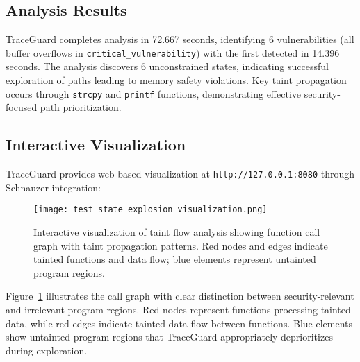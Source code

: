 \subsection{Analysis Results}

TraceGuard completes analysis in 72.667 seconds, identifying 6 vulnerabilities (all buffer overflows in \texttt{critical\_vulnerability}) with the first detected in 14.396 seconds. The analysis discovers 6 unconstrained states, indicating successful exploration of paths leading to memory safety violations. Key taint propagation occurs through \texttt{strcpy} and \texttt{printf} functions, demonstrating effective security-focused path prioritization.

\subsection{Interactive Visualization}

TraceGuard provides web-based visualization at \texttt{http://127.0.0.1:8080} through Schnauzer integration:

\begin{figure}[htbp]
    \centering
    \texttt{[image: test\_state\_explosion\_visualization.png]}
    \caption{Interactive visualization of taint flow analysis showing function call graph with taint propagation patterns. Red nodes and edges indicate tainted functions and data flow; blue elements represent untainted program regions.}
    \label{fig:test_state_explosion_visualization}
\end{figure}

Figure~\ref{fig:test_state_explosion_visualization} illustrates the call graph with clear distinction between security-relevant and irrelevant program regions. Red nodes represent functions processing tainted data, while red edges indicate tainted data flow between functions. Blue elements show untainted program regions that TraceGuard appropriately deprioritizes during exploration.
